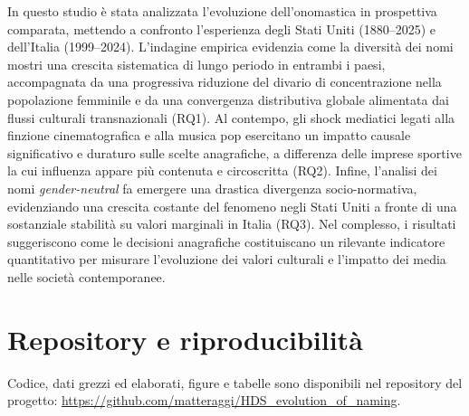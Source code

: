 \documentclass[conference]{IEEEtran}
\begin{document}
In questo studio è stata analizzata l'evoluzione dell'onomastica in prospettiva comparata, 
mettendo a confronto l'esperienza degli Stati Uniti (1880--2025) e dell'Italia (1999--2024). 
L'indagine empirica evidenzia come la diversità dei nomi mostri una crescita sistematica di 
lungo periodo in entrambi i paesi, accompagnata da una progressiva riduzione del divario di 
concentrazione nella popolazione femminile e da una convergenza distributiva globale alimentata 
dai flussi culturali transnazionali (RQ1). Al contempo, gli shock mediatici legati alla finzione 
cinematografica e alla musica pop esercitano un impatto causale significativo e duraturo sulle 
scelte anagrafiche, a differenza delle imprese sportive la cui influenza appare più contenuta e 
circoscritta (RQ2). Infine, l'analisi dei nomi \emph{gender-neutral} fa emergere una drastica 
divergenza socio-normativa, evidenziando una crescita costante del fenomeno negli Stati Uniti a 
fronte di una sostanziale stabilità su valori marginali in Italia (RQ3). Nel complesso, i risultati 
suggeriscono come le decisioni anagrafiche costituiscano un rilevante indicatore quantitativo per 
misurare l'evoluzione dei valori culturali e l'impatto dei media nelle società contemporanee.

\section*{Repository e riproducibilità}

Codice, dati grezzi ed elaborati, figure e tabelle sono disponibili nel repository del progetto:
\url{https://github.com/matteraggi/HDS_evolution_of_naming}.
\end{document}

